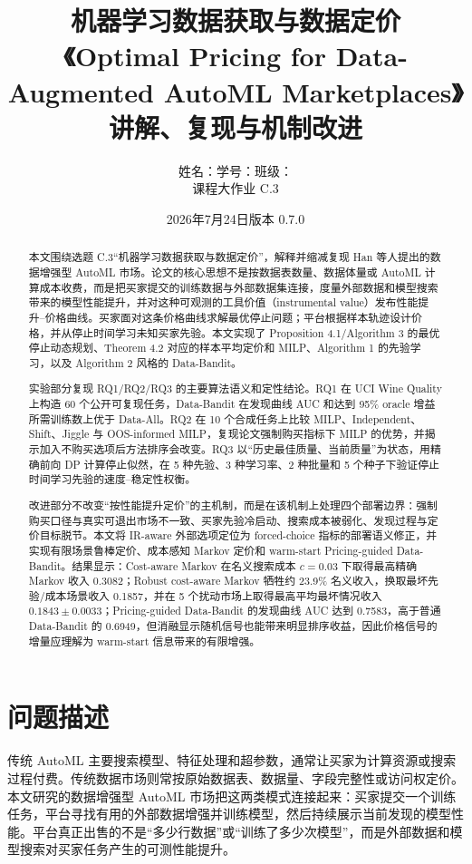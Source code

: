 \documentclass[11pt,a4paper]{ctexart}
\title{机器学习数据获取与数据定价\\
\large 《Optimal Pricing for Data-Augmented AutoML Marketplaces》讲解、复现与机制改进}
\author{姓名：\underline{\hspace{2.8cm}}\quad 学号：\underline{\hspace{3.0cm}}\quad 班级：\underline{\hspace{2.8cm}}\\课程大作业 C.3}
\date{2026年7月24日\quad 版本 0.7.0}
\theoremstyle{definition}
\begin{document}
\maketitle

\begin{abstract}
本文围绕选题 C.3“机器学习数据获取与数据定价”，解释并缩减复现 Han 等人提出的数据增强型 AutoML 市场。论文的核心思想不是按数据表数量、数据体量或 AutoML 计算成本收费，而是把买家提交的训练数据与外部数据集连接，度量外部数据和模型搜索带来的模型性能提升，并对这种可观测的工具价值（instrumental value）发布性能提升--价格曲线。买家面对这条价格曲线求解最优停止问题；平台根据样本轨迹设计价格，并从停止时间学习未知买家先验。本文实现了 Proposition 4.1/Algorithm 3 的最优停止动态规划、Theorem 4.2 对应的样本平均定价和 MILP、Algorithm 1 的先验学习，以及 Algorithm 2 风格的 Data-Bandit。

实验部分复现 RQ1/RQ2/RQ3 的主要算法语义和定性结论。RQ1 在 UCI Wine Quality 上构造 60 个公开可复现任务，Data-Bandit 在发现曲线 AUC 和达到 95\% oracle 增益所需训练数上优于 Data-All。RQ2 在 10 个合成任务上比较 MILP、Independent、Shift、Jiggle 与 OOS-informed MILP，复现论文强制购买指标下 MILP 的优势，并揭示加入不购买选项后方法排序会改变。RQ3 以“历史最佳质量、当前质量”为状态，用精确前向 DP 计算停止似然，在 5 种先验、3 种学习率、2 种批量和 5 个种子下验证停止时间学习先验的速度--稳定性权衡。

改进部分不改变“按性能提升定价”的主机制，而是在该机制上处理四个部署边界：强制购买口径与真实可退出市场不一致、买家先验冷启动、搜索成本被弱化、发现过程与定价目标脱节。本文将 IR-aware 外部选项定位为 forced-choice 指标的部署语义修正，并实现有限场景鲁棒定价、成本感知 Markov 定价和 warm-start Pricing-guided Data-Bandit。结果显示：Cost-aware Markov 在名义搜索成本 $c=0.03$ 下取得最高精确 Markov 收入 0.3082；Robust cost-aware Markov 牺牲约 23.9\% 名义收入，换取最坏先验/成本场景收入 0.1857，并在 5 个扰动市场上取得最高平均最坏情况收入 $0.1843\pm0.0033$；Pricing-guided Data-Bandit 的发现曲线 AUC 达到 0.7583，高于普通 Data-Bandit 的 0.6949，但消融显示随机信号也能带来明显排序收益，因此价格信号的增量应理解为 warm-start 信息带来的有限增强。
\end{abstract}

\tableofcontents
\newpage

\section{问题描述}

传统 AutoML 主要搜索模型、特征处理和超参数，通常让买家为计算资源或搜索过程付费。传统数据市场则常按原始数据表、数据量、字段完整性或访问权定价。本文研究的数据增强型 AutoML 市场把这两类模式连接起来：买家提交一个训练任务，平台寻找有用的外部数据增强并训练模型，然后持续展示当前发现的模型性能。平台真正出售的不是“多少行数据”或“训练了多少次模型”，而是外部数据和模型搜索对买家任务产生的可测性能提升。
\end{document}
